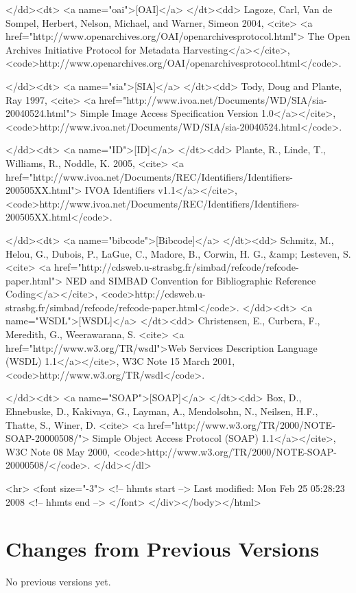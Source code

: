 \documentclass[11pt,a4paper]{ivoa}
\begin{document}
  </dd><dt> <a name="oai">[OAI]</a>
  </dt><dd> Lagoze, Carl, Van de Sompel, Herbert, Nelson, Michael, and
       Warner, Simeon 2004, <cite>
       <a href="http://www.openarchives.org/OAI/openarchivesprotocol.html">
       The Open Archives Initiative Protocol for Metadata Harvesting</a></cite>,
       <code>http://www.openarchives.org/OAI/openarchivesprotocol.html</code>.

  </dd><dt> <a name="sia">[SIA]</a>
  </dt><dd> Tody, Doug and Plante, Ray 1997, <cite>
       <a href="http://www.ivoa.net/Documents/WD/SIA/sia-20040524.html">
       Simple Image Access Specification Version 1.0</a></cite>,
       <code>http://www.ivoa.net/Documents/WD/SIA/sia-20040524.html</code>.

  </dd><dt> <a name="ID">[ID]</a>
  </dt><dd> Plante, R., Linde, T., Williams, R., Noddle, K. 2005, <cite>
       <a href="http://www.ivoa.net/Documents/REC/Identifiers/Identifiers-200505XX.html">
       IVOA Identifiers v1.1</a></cite>,
       <code>http://www.ivoa.net/Documents/REC/Identifiers/Identifiers-200505XX.html</code>.

  </dd><dt> <a name="bibcode">[Bibcode]</a>
  </dt><dd> Schmitz, M., Helou, G., Dubois, P., LaGue, C., Madore, B.,
       Corwin, H. G., &amp; Lesteven, S. <cite>
       <a href="http://cdsweb.u-strasbg.fr/simbad/refcode/refcode-paper.html">
       NED and SIMBAD Convention for Bibliographic Reference Coding</a></cite>,
       <code>http://cdsweb.u-strasbg.fr/simbad/refcode/refcode-paper.html</code>.
  </dd><dt> <a name="WSDL">[WSDL]</a>
  </dt><dd> Christensen, E., Curbera, F., Meredith, G., Weerawarana, S. <cite>
       <a href="http://www.w3.org/TR/wsdl">Web Services Description
       Language (WSDL) 1.1</a></cite>, W3C Note 15 March 2001,
       <code>http://www.w3.org/TR/wsdl</code>.
       
  </dd><dt> <a name="SOAP">[SOAP]</a>
  </dt><dd> Box, D., Ehnebuske, D., Kakivaya, G., Layman, A., Mendolsohn,
       N., Neilsen, H.F., Thatte, S., Winer, D. <cite>
       <a href="http://www.w3.org/TR/2000/NOTE-SOAP-20000508/">
       Simple Object Access Protocol (SOAP) 1.1</a></cite>, W3C Note
       08 May 2000,
       <code>http://www.w3.org/TR/2000/NOTE-SOAP-20000508/</code>.
</dd></dl>

<hr>
<font size="-3">
<!-- hhmts start -->
Last modified: Mon Feb 25 05:28:23 2008
<!-- hhmts end -->
</font>
</div></body></html>

\appendix
\section{Changes from Previous Versions}

No previous versions yet.  



\end{document}
